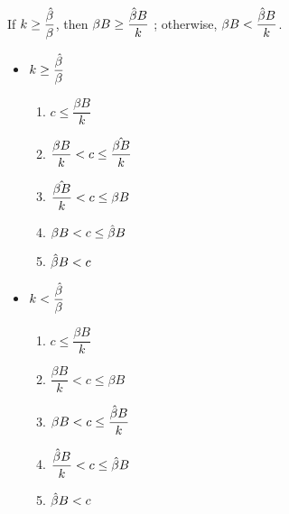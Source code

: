 \documentclass{jsarticle}
\begin{document}
\begin{enumerate}
\begin{enumerate}
\begin{center}
\end{center}

\vspace{1zw}

If $k \geq \dfrac{\Hat{\beta}}{\beta}$, then $\beta B \geq \dfrac{\Hat{\beta}B}{k}$ ; otherwise, $\beta B < \dfrac{\Hat{\beta}B}{k}$.

 \begin{itemize}
 
 \item $k \geq \dfrac{\Hat{\beta}}{\beta}$
 
  \begin{enumerate}
  
  \item $c \leq \dfrac{\beta B}{k}$
  
  
  
  \item $\dfrac{\beta B}{k} < c \leq \dfrac{\Hat{\beta B}}{k}$
  
  
  
  \item $\dfrac{\Hat{\beta B}}{k} < c \leq \beta B$
  
  
  
  \item $\beta B < c \leq \Hat{\beta} B $
  
  
 
  \item $\Hat{\beta} B < c$
  
  
  
  \end{enumerate}
 
 \item $k < \dfrac{\Hat{\beta}}{\beta}$
 
 \begin{enumerate}
  
  \item $c \leq \dfrac{\beta B}{k}$
  
  
  
  \item $\dfrac{\beta B}{k} < c \leq \beta B $
  
  
  
  \item $\beta B < c \leq \dfrac{\Hat{\beta} B}{k}$
  
  
  
  \item $\dfrac{\Hat{\beta} B}{k} < c \leq \Hat{\beta}B$
  
  
  
  \item $\Hat{\beta}B < c$
  

\end{enumerate}
\end{itemize}
\end{enumerate}
\end{enumerate}
\end{document}
